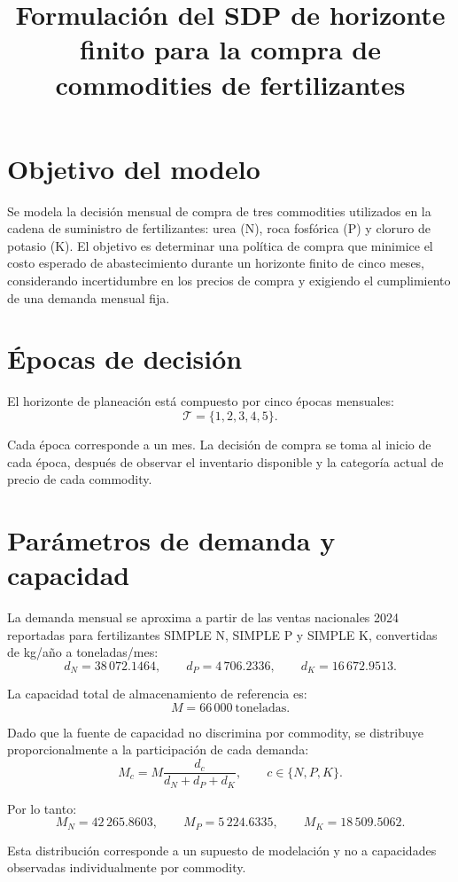 \documentclass[11pt]{article}
\title{Formulación del SDP de horizonte finito para la compra de commodities de fertilizantes}
\author{}
\date{}
\begin{document}
\maketitle

\section{Objetivo del modelo}

Se modela la decisión mensual de compra de tres commodities utilizados en la cadena de suministro de fertilizantes: urea (N), roca fosfórica (P) y cloruro de potasio (K). El objetivo es determinar una política de compra que minimice el costo esperado de abastecimiento durante un horizonte finito de cinco meses, considerando incertidumbre en los precios de compra y exigiendo el cumplimiento de una demanda mensual fija.

\section{Épocas de decisión}

El horizonte de planeación está compuesto por cinco épocas mensuales:
\[
\mathcal{T}=\{1,2,3,4,5\}.
\]

Cada época corresponde a un mes. La decisión de compra se toma al inicio de cada época, después de observar el inventario disponible y la categoría actual de precio de cada commodity.

\section{Parámetros de demanda y capacidad}

La demanda mensual se aproxima a partir de las ventas nacionales 2024 reportadas para fertilizantes SIMPLE N, SIMPLE P y SIMPLE K, convertidas de kg/año a toneladas/mes:
\[
 d_N = 38\,072.1464,\qquad
 d_P = 4\,706.2336,\qquad
 d_K = 16\,672.9513.
\]

La capacidad total de almacenamiento de referencia es:
\[
M=66\,000\ \text{toneladas}.
\]

Dado que la fuente de capacidad no discrimina por commodity, se distribuye proporcionalmente a la participación de cada demanda:
\[
M_c=M\frac{d_c}{d_N+d_P+d_K}, \qquad c\in\{N,P,K\}.
\]

Por lo tanto:
\[
M_N=42\,265.8603,\qquad
M_P=5\,224.6335,\qquad
M_K=18\,509.5062.
\]

Esta distribución corresponde a un supuesto de modelación y no a capacidades observadas individualmente por commodity.
\end{document}
